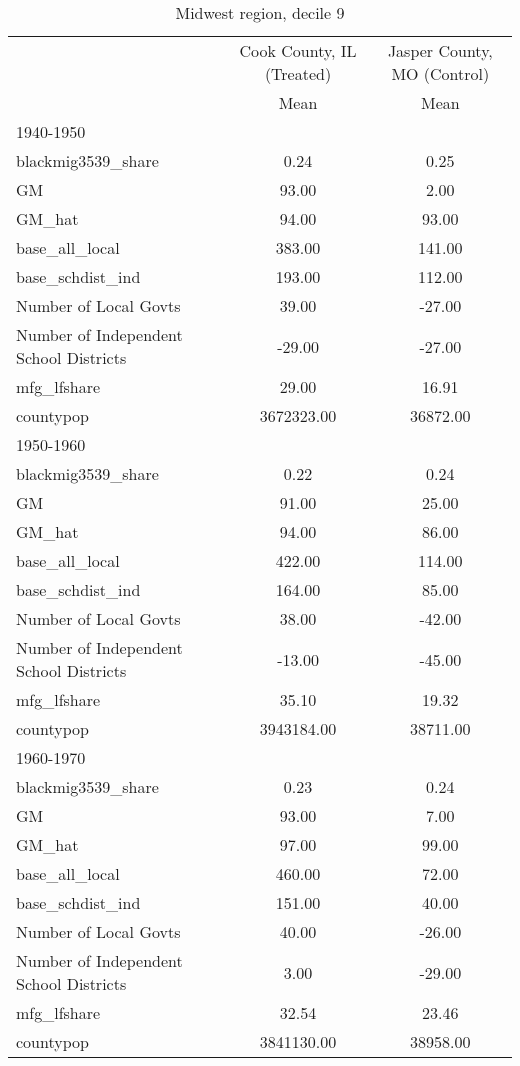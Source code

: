 \begin{table}[htbp]\centering
\def\sym#1{\ifmmode^{#1}\else\(^{#1}\)\fi}
\caption{Midwest region, decile 9 \label{tab1}}
\begin{tabular}{l*{2}{c}}
\toprule
                    &\multicolumn{1}{c}{Cook County, IL (Treated)}&\multicolumn{1}{c}{Jasper County, MO (Control)}\\
                    &        Mean&        Mean\\
\midrule
1940-1950           &            &            \\
blackmig3539\_share  &        0.24&        0.25\\
GM                  &       93.00&        2.00\\
GM\_hat              &       94.00&       93.00\\
base\_all\_local      &      383.00&      141.00\\
base\_schdist\_ind    &      193.00&      112.00\\
Number of Local Govts&       39.00&      -27.00\\
Number of Independent School Districts&      -29.00&      -27.00\\
mfg\_lfshare         &       29.00&       16.91\\
countypop           &  3672323.00&    36872.00\\
\midrule
1950-1960           &            &            \\
blackmig3539\_share  &        0.22&        0.24\\
GM                  &       91.00&       25.00\\
GM\_hat              &       94.00&       86.00\\
base\_all\_local      &      422.00&      114.00\\
base\_schdist\_ind    &      164.00&       85.00\\
Number of Local Govts&       38.00&      -42.00\\
Number of Independent School Districts&      -13.00&      -45.00\\
mfg\_lfshare         &       35.10&       19.32\\
countypop           &  3943184.00&    38711.00\\
\midrule
1960-1970           &            &            \\
blackmig3539\_share  &        0.23&        0.24\\
GM                  &       93.00&        7.00\\
GM\_hat              &       97.00&       99.00\\
base\_all\_local      &      460.00&       72.00\\
base\_schdist\_ind    &      151.00&       40.00\\
Number of Local Govts&       40.00&      -26.00\\
Number of Independent School Districts&        3.00&      -29.00\\
mfg\_lfshare         &       32.54&       23.46\\
countypop           &  3841130.00&    38958.00\\
\bottomrule
\end{tabular}
\end{table}
